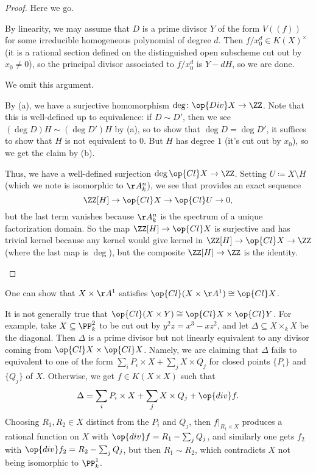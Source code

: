 \documentclass[../notes.tex]{subfiles}
\begin{document}
\begin{proof}
	Here we go.
	\begin{listalph}
		\item By linearity, we may assume that $D$ is a prime divisor $Y$ of the form $V((f))$ for some irreducible homogeneous polynomial of degree $d$. Then $f/x_0^d\in K(X)^\times$ (it is a rational section defined on the distinguished open subscheme cut out by $x_0\ne0$), so the principal divisor associated to $f/x_0^d$ is $Y-dH$, so we are done.
		\item We omit this argument.
		\item By (a), we have a surjective homomorphism $\deg\colon\op{Div}X\to\ZZ$. Note that this is well-defined up to equivalence: if $D\sim D'$, then we see $(\deg D)H\sim(\deg D')H$ by (a), so to show that $\deg D=\deg D'$, it suffices to show that $H$ is not equivalent to $0$. But $H$ has degree $1$ (it's cut out by $x_0$), so we get the claim by (b).

		Thus, we have a well-defined surjection $\deg\op{Cl}X\to\ZZ$. Setting $U\coloneqq X\setminus H$ (which we note is isomorphic to $\AA^n_k$), we see that  provides an exact sequence
		\[\ZZ[H]\to\op{Cl}X\to\op{Cl}U\to0,\]
		but the last term vanishes because $\AA^n_k$ is the spectrum of a unique factorization domain. So the map $\ZZ[H]\to\op{Cl}X$ is surjective and has trivial kernel because any kernel would give kernel in $\ZZ[H]\to\op{Cl}X\to\ZZ$ (where the last map is $\deg$), but the composite $\ZZ[H]\to\ZZ$ is the identity.
		\qedhere
	\end{listalph}
\end{proof}
\begin{remark}
	One can show that $X\times\AA^1$ satisfies $\op{Cl}(X\times\AA^1)\cong\op{Cl}X$.
\end{remark}
\begin{remark}
	It is not generally true that $\op{Cl}(X\times Y)\cong\op{Cl}X\times\op{Cl}Y$. For example, take $X\subseteq\PP^2_k$ to be cut out by $y^2z=x^3-xz^2$, and let $\Delta\subseteq X\times_kX$ be the diagonal. Then $\Delta$ is a prime divisor but not linearly equivalent to any divisor coming from $\op{Cl}X\times\op{Cl}X$. Namely, we are claiming that $\Delta$ fails to equivalent to one of the form $\sum_iP_i\times X+\sum_jX\times Q_j$ for closed points $\{P_i\}$ and $\{Q_j\}$ of $X$. Otherwise, we get $f\in K(X\times X)$ such that
	\[\Delta=\sum_iP_i\times X+\sum_jX\times Q_j+\op{div}f.\]
	Choosing $R_1,R_2\in X$ distinct from the $P_i$ and $Q_j$, then $f|_{R_1\times X}$ produces a rational function on $X$ with $\op{div}f=R_1-\sum_jQ_j$, and similarly one gets $f_2$ with $\op{div}f_2=R_2-\sum_jQ_j$, but then $R_1\sim R_2$, which contradicts $X$ not being isomorphic to $\PP^1_k$.
\end{remark}
\end{document}
